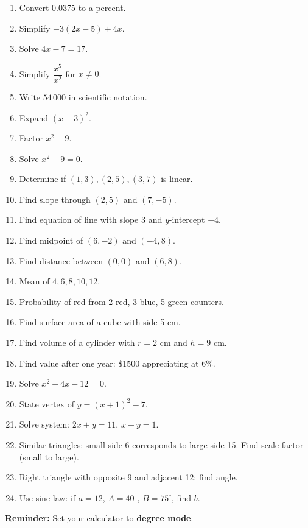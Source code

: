 \documentclass[12pt,oneside]{article}
\newcommand{\ws}[1]{\vspace*{#1}}
\newcommand{\degmode}{\textbf{Reminder:} Set your calculator to \textbf{degree mode}.}
\begin{document}
\begin{enumerate}
  \item Convert 0.0375 to a percent. \ws{1.3cm}
  \item Simplify $-3(2x-5)+4x$. \ws{1.5cm}
  \item Solve $4x-7=17$. \ws{1.4cm}
  \item Simplify $\dfrac{x^5}{x^2}$ for $x\ne0$. \ws{1.4cm}
  \item Write $54\,000$ in scientific notation. \ws{1.5cm}
  \item Expand $(x-3)^2$. \ws{1.6cm}
  \item Factor $x^2-9$. \ws{1.4cm}
  \item Solve $x^2-9=0$. \ws{1.5cm}
  \item Determine if $(1,3),(2,5),(3,7)$ is linear. \ws{1.6cm}
  \item Find slope through $(2,5)$ and $(7,-5)$. \ws{1.6cm}
  \item Find equation of line with slope 3 and $y$-intercept $-4$. \ws{1.6cm}
  \item Find midpoint of $(6,-2)$ and $(-4,8)$. \ws{1.6cm}
  \item Find distance between $(0,0)$ and $(6,8)$. \ws{1.7cm}
  \item Mean of $4,6,8,10,12$. \ws{1.3cm}
  \item Probability of red from 2 red, 3 blue, 5 green counters. \ws{1.5cm}
  \item Find surface area of a cube with side 5 cm. \ws{1.5cm}
  \item Find volume of a cylinder with $r=2$ cm and $h=9$ cm. \ws{1.5cm}
  \item Find value after one year: \$1500 appreciating at 6\%. \ws{1.6cm}
  \item Solve $x^2-4x-12=0$. \ws{1.7cm}
  \item State vertex of $y=(x+1)^2-7$. \ws{1.4cm}
  \item Solve system: $2x+y=11$, $x-y=1$. \ws{1.8cm}
  \item Similar triangles: small side 6 corresponds to large side 15. Find scale factor (small to large). \ws{1.5cm}
  \item Right triangle with opposite 9 and adjacent 12: find angle. \ws{1.7cm}
  \item Use sine law: if $a=12$, $A=40^\circ$, $B=75^\circ$, find $b$. \ws{2.0cm}
\end{enumerate}
\degmode
\end{document}
